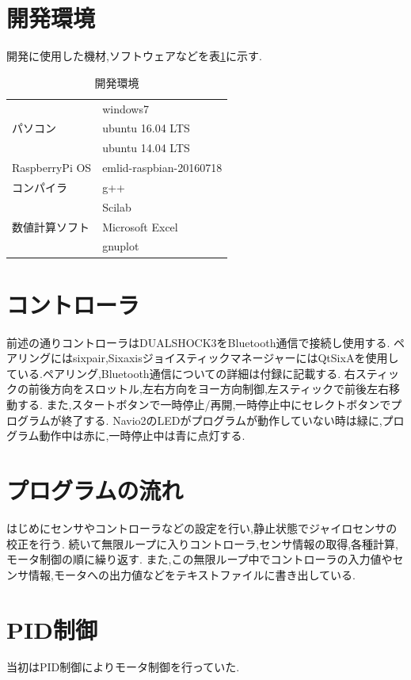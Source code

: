 \documentclass[12pt,oneside]{sotsuken_paper}
\begin{document}
\section{開発環境}
開発に使用した機材,ソフトウェアなどを表\ref{table:dev}に示す.

\begin{table}[htbp]
	\begin{center}
		\caption{開発環境}
		\begin{tabular}{|l|l|} \hline
			 & windows7 \\
			パソコン & ubuntu 16.04 LTS \\
			 & ubuntu 14.04 LTS \\ \hline
			RaspberryPi OS & emlid-raspbian-20160718 \\ \hline
			コンパイラ & g++ \\ \hline
			 & Scilab \\
			数値計算ソフト & Microsoft Excel \\
			 & gnuplot \\ \hline
		\end{tabular}
		\label{table:dev}
	\end{center}
\end{table}

\section{コントローラ}
前述の通りコントローラはDUALSHOCK3をBluetooth通信で接続し使用する.
ペアリングにはsixpair,SixaxisジョイスティックマネージャーにはQtSixAを使用している.ペアリング,Bluetooth通信についての詳細は付録に記載する.
右スティックの前後方向をスロットル,左右方向をヨー方向制御,左スティックで前後左右移動する.
また,スタートボタンで一時停止/再開,一時停止中にセレクトボタンでプログラムが終了する.
Navio2のLEDがプログラムが動作していない時は緑に,プログラム動作中は赤に,一時停止中は青に点灯する.

\section{プログラムの流れ}
はじめにセンサやコントローラなどの設定を行い,静止状態でジャイロセンサの校正を行う.
続いて無限ループに入りコントローラ,センサ情報の取得,各種計算,モータ制御の順に繰り返す.
また,この無限ループ中でコントローラの入力値やセンサ情報,モータへの出力値などをテキストファイルに書き出している.

\section{PID制御}
当初はPID制御によりモータ制御を行っていた.
\end{document}
